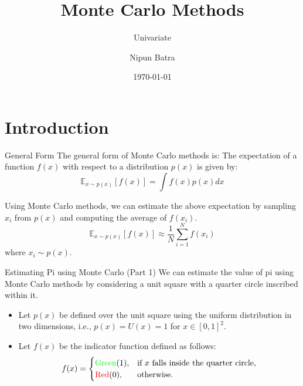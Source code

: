 \documentclass[handout]{beamer}
\begin{document}
\title{Monte Carlo Methods}
\subtitle{Univariate}
\author{Nipun Batra}
\date{\today}
\maketitle

\section{Introduction}

\begin{frame}{General Form}
The general form of Monte Carlo methods is:
The expectation of a function $f(x)$ with respect to a distribution $p(x)$ is given by:
\begin{equation}
    \mathbb{E}_{x \sim p(x)}[f(x)] = \int f(x) p(x) dx
\end{equation}

Using Monte Carlo methods, we can estimate the above expectation by sampling $x_i$ from $p(x)$ and computing the average of $f(x_i)$.
\begin{equation}
    \mathbb{E}_{x \sim p(x)}[f(x)] \approx \frac{1}{N} \sum_{i=1}^{N} f(x_i)
\end{equation}
where $x_i \sim p(x)$.
\end{frame}
\begin{frame}[fragile]{Estimating Pi using Monte Carlo (Part 1)}
    We can estimate the value of pi using Monte Carlo methods by considering a unit square with a quarter circle inscribed within it.
    
    \begin{itemize}
        \item Let $p(x)$ be defined over the unit square using the uniform distribution in two dimensions, i.e., $p(x) = U(x) = 1$ for $x \in [0, 1]^2$.
        \item Let $f(x)$ be the indicator function defined as follows:
            \[
            f(x) = \begin{cases}
                        \text{\textcolor{green}{Green}} (1), & \text{if } x \text{ falls inside the quarter circle}, \\
                        \text{\textcolor{red}{Red}} (0), & \text{otherwise}.
                   \end{cases}
            \]
    \end{itemize}
\end{frame}
    
\end{document}
